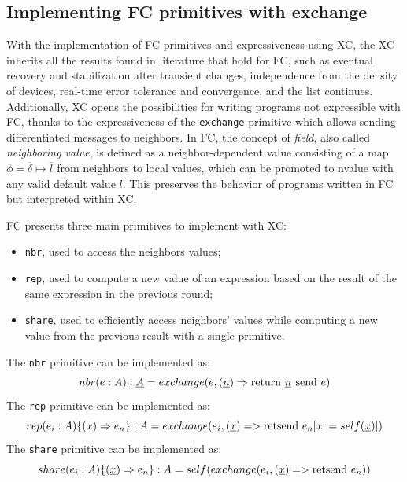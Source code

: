 \subsection{Implementing FC primitives with exchange}

With the implementation of \ac{FC} primitives and expressiveness using \ac{XC}, the \ac{XC} inherits all the results found in literature that hold for \ac{FC}, such as eventual recovery and stabilization after transient changes\cite{self-stabilisation-in-fc}, independence from the density of devices\cite{density-independence-in-fc}, real-time error tolerance and convergence\cite{real-time-error-tolerance-in-fc}, and the list continues\cite{xc}.
%
Additionally, \ac{XC} opens the possibilities for writing programs not expressible with \ac{FC}, thanks to the expressiveness of the \texttt{exchange} primitive which allows sending differentiated messages to neighbors.
%
In \ac{FC}, the concept of \textit{field}, also called \textit{neighboring value}, is defined as a neighbor-dependent value consisting of a map $\phi = \overline{\delta} \mapsto \overline{l}$ from neighbors to local values, which can be promoted to nvalue with any valid default value $l$.
%
This preserves the behavior of programs written in \ac{FC} but interpreted within \ac{XC}\cite{xc}.

\ac{FC} presents three main primitives to implement with \ac{XC}:
\begin{itemize}
    \item \texttt{nbr}, used to access the neighbors values\cite{from-dc-to-fc-and-ap};
    \item \texttt{rep}, used to compute a new value of an expression based on the result of the same expression in the previous round\cite{from-dc-to-fc-and-ap};
    \item \texttt{share}, used to efficiently access neighbors' values while computing a new value from the previous result with a single primitive\cite{share-operator}.
\end{itemize}

The \texttt{nbr} primitive can be implemented as: $$nbr(e: A): \underline{A} = exchange(e, (\underline{n}) \Rightarrow \operatorname{return\,} \underline{n} \operatorname{\:send\,} e)$$
%
The \texttt{rep} primitive can be implemented as: $$rep(e_i: A)\{(x) \Rightarrow e_n\}: A = exchange(e_i, (\underline{x}) => \operatorname{retsend\,} e_n[x := self(\underline{x})])$$
%
The \texttt{share} primitive can be implemented as: $$share(e_i: A)\{(\underline{x}) \Rightarrow e_n\}: A = self(exchange(e_i, (\underline{x}) => \operatorname{retsend\,} e_n))$$

